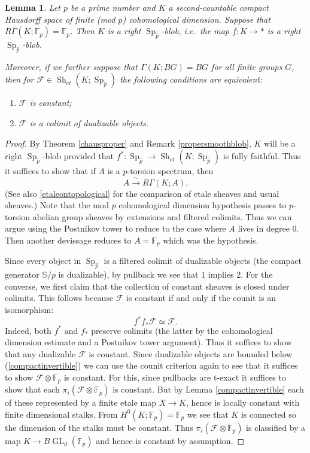 \documentclass[12pt]{article}
\newtheorem{lemma}[theorem]{Lemma}
\newcommand{\on}{\operatorname}
\newcommand{\mc}{\mathcal}
\newcommand{\mbb}{\mathbb}
\newcommand{\wh}{\widehat}
\begin{document}
\begin{lemma}\label{explicitblob}
Let $p$ be a prime number and $K$ a second-countable compact Hausdorff space of finite (mod $p$) cohomological dimension.  Suppose that $R\Gamma(K;\mathbb{F}_p)=\mathbb{F}_p$.
Then $K$ is a right $\on{Sp}_{\wh{p}}$-blob, i.e.\ the map $f:K\to \ast$ is a right $\on{Sp}_{\wh{p}}$-blob.  

Moreover, if we further suppose that $\Gamma(K;BG)=BG$ for all finite groups $G$, then for $\mc{F}\in\on{Sh}_{et}(K;\on{Sp}_{\wh{p}})$ the following conditions are equivalent:
\begin{enumerate}
\item $\mathcal{F}$ is constant;
\item $\mc{F}$ is a colimit of dualizable objects.
\end{enumerate}
\end{lemma}
\begin{proof}
By Theorem \ref{chausproper} and Remark \ref{propersmoothblob}, $K$ will be a right $\on{Sp}_{\wh{p}}$-blob provided that $f^\ast:\on{Sp}_{\wh{p}}\to\on{Sh}_{et}(K;\on{Sp}_{\wh{p}})$ is fully faithful.  Thus it suffices to show that if $A$ is a $p$-torsion spectrum, then
$$A \overset{\sim}{\rightarrow} R\Gamma(K;A).$$
(See also \ref{etaleontopological} for the comparison of etale sheaves and usual sheaves.) Note that the mod $p$ cohomological dimension hypothesis passes to $p$-torsion abelian group sheaves by extensions and filtered colimits.  Thus we can argue using the Postnikov tower to reduce to the case where $A$ lives in degree $0$.  Then another devissage reduces to $A=\mathbb{F}_p$ which was the hypothesis.

Since every object in $\on{Sp}_{\wh{p}}$ is a filtered colimit of dualizable objects (the compact generator $\mbb{S}/p$ is dualizable), by pullback we see that 1 implies 2.  For the converse, we first claim that the collection of constant sheaves is closed under colimits.  This follows because $\mc{F}$ is constant if and only if the counit is an isomorphism:
$$f^\ast f_\ast \mc{F}\simeq \mc{F}.$$
Indeed, both $f^\ast$ and $f_\ast$ preserve colimits (the latter by the cohomological dimension estimate and a Postnikov tower argument).  Thus it suffices to show that any dualizable $\mc{F}$ is constant.  Since dualizable objects are bounded below (\ref{compactinvertible}) we can use the counit criterion again to see that it suffices to show $\mc{F}\otimes\mbb{F}_p$ is constant.  For this, since pullbacks are t-exact it suffices to show that each $\pi_i (\mc{F}\otimes \mbb{F}_p)$ is constant.  But by Lemma \ref{compactinvertible} each of these represented by a finite etale map $X\to K$, hence is locally constant with finite dimensional stalks.  From $H^0(K;\mbb{F}_p)=\mbb{F}_p$ we see that $K$ is connected so the dimension of the stalks must be constant. Thus $\pi_i (\mc{F}\otimes \mbb{F}_p)$ is classified by a map $K \to B\on{GL}_d(\mbb{F}_p)$ and hence is constant by assumption.
\end{proof}
\end{document}
